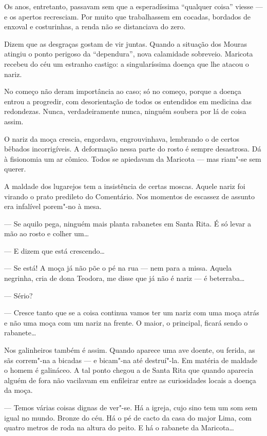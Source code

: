 Os anos, entretanto, passavam sem que a esperadíssima ``qualquer coisa''
viesse --- e os apertos recresciam. Por muito que trabalhassem em
cocadas, bordados de enxoval e costurinhas, a renda não se distanciava
do zero.

Dizem que as desgraças gostam de vir juntas. Quando a situação dos
Mouras atingiu o ponto perigoso da ``dependura'', nova calamidade
sobreveio. Maricota recebeu do céu um estranho castigo: a singularíssima
doença que lhe atacou o nariz.

No começo não deram importância ao caso; só no começo, porque a doença
entrou a progredir, com desorientação de todos os entendidos em medicina
das redondezas. Nunca, verdadeiramente nunca, ninguém soubera por lá de
coisa assim.

O nariz da moça crescia, engordava, engrouvinhava, lembrando o de certos
bêbados incorrigíveis. A deformação nessa parte do rosto é sempre
desastrosa. Dá à fisionomia um ar cômico. Todos se apiedavam da Maricota
--- mas riam"-se sem querer.

A maldade dos lugarejos tem a insistência de certas moscas. Aquele nariz
foi virando o prato predileto do Comentário. Nos momentos de escassez de
assunto era infalível porem"-no à mesa.

--- Se aquilo pega, ninguém mais planta rabanetes em Santa Rita. É só
levar a mão ao rosto e colher um\ldots{}

--- E dizem que está crescendo\ldots{}

--- Se está! A moça já não põe o pé na rua --- nem para a missa. Aquela
negrinha, cria de dona Teodora, me disse que já não é nariz --- é
beterraba\ldots{}

--- Sério?

--- Cresce tanto que se a coisa continua vamos ter um nariz com uma moça
atrás e não uma moça com um nariz na frente. O maior, o principal,
ficará sendo o rabanete\ldots{}

Nos galinheiros também é assim. Quando aparece uma ave doente, ou
ferida, as sãs correm"-na a bicadas --- e bicam"-na até destruí"-la. Em
matéria de maldade o homem é galináceo. A tal ponto chegou a de Santa
Rita que quando aparecia alguém de fora não vacilavam em enfileirar
entre as curiosidades locais a doença da moça.

--- Temos várias coisas dignas de ver"-se. Há a igreja, cujo sino tem um
som sem igual no mundo. Bronze do céu. Há o pé de cacto da casa do major
Lima, com quatro metros de roda na altura do peito. E há o rabanete da
Maricota\ldots{}

